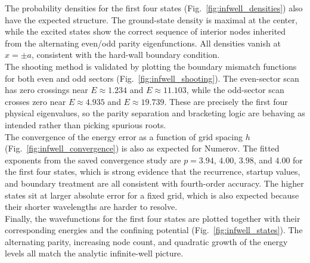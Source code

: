 \documentclass[11pt]{article}
\begin{document}
\begin{refsection}
            The probability densities for the first four states (Fig.~\ref{fig:infwell_densities}) also have the expected structure. The ground-state density is maximal at the center, while the excited states show the correct sequence of interior nodes inherited from the alternating even/odd parity eigenfunctions. All densities vanish at $x=\pm a$, consistent with the hard-wall boundary condition. \\

            The shooting method is validated by plotting the boundary mismatch functions for both even and odd sectors (Fig.~\ref{fig:infwell_shooting}). The even-sector scan has zero crossings near $E\approx1.234$ and $E\approx11.103$, while the odd-sector scan crosses zero near $E\approx4.935$ and $E\approx19.739$. These are precisely the first four physical eigenvalues, so the parity separation and bracketing logic are behaving as intended rather than picking spurious roots. \\

            The convergence of the energy error as a function of grid spacing $h$ (Fig.~\ref{fig:infwell_convergence}) is also as expected for Numerov. The fitted exponents from the saved convergence study are $p=3.94$, $4.00$, $3.98$, and $4.00$ for the first four states, which is strong evidence that the recurrence, startup values, and boundary treatment are all consistent with fourth-order accuracy. The higher states sit at larger absolute error for a fixed grid, which is also expected because their shorter wavelengths are harder to resolve. \\

            Finally, the wavefunctions for the first four states are plotted together with their corresponding energies and the confining potential (Fig.~\ref{fig:infwell_states}). The alternating parity, increasing node count, and quadratic growth of the energy levels all match the analytic infinite-well picture. \\

            \begin{figure}[p]
                \centering
                

\end{figure}
\end{refsection}
\end{document}
